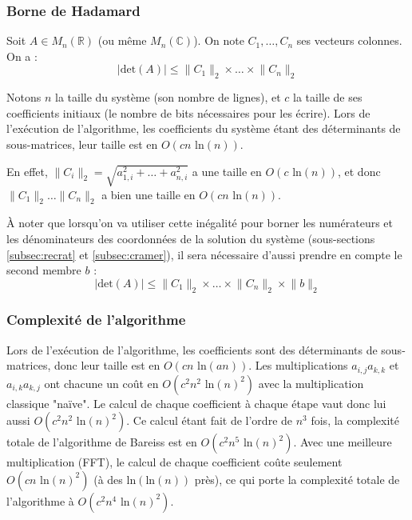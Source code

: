 \documentclass[french]{article}
\begin{document}
\subsubsection{Borne de Hadamard} \label{subsubsec:hada}
Soit $A \in M_n(\mathbb{R})$ (ou même $M_n(\mathbb{C})$). On note $C_1,\hdots,C_n$ ses vecteurs colonnes. On a :
$$ \lvert \mbox{det}(A) \rvert \le \lVert C_1 \rVert_2 \times \hdots \times \lVert C_n \rVert_2$$
\par
Notons $n$ la taille du système (son nombre de lignes), et $c$ la taille de ses coefficients initiaux (le nombre de bits nécessaires pour les écrire). Lors de l'exécution de l'algorithme, les coefficients du système étant des déterminants de sous-matrices, leur taille est en $O(cn \mbox{ ln}(n))$.
\par
En effet, $\lVert C_i \rVert_2 = \sqrt{a_{1,i}^2 + \hdots + a_{n,i}^2}$ a une taille en $O(c\mbox{ ln}(n))$, et donc $\lVert C_1 \rVert_2 \hdots \lVert C_n \rVert_2$ a bien une taille en $O(cn \mbox{ ln}(n))$.
\par
À noter que lorsqu'on va utiliser cette inégalité pour borner les numérateurs et les dénominateurs des coordonnées de la solution du système (sous-sections \ref{subsec:recrat} et \ref{subsec:cramer}), il sera nécessaire d'aussi prendre en compte le second membre $b$ :
$$ \lvert \mbox{det}(A) \rvert \le \lVert C_1 \rVert_2 \times \hdots \times \lVert C_n \rVert_2 \times \lVert b \rVert_2$$
\subsubsection{Complexité de l'algorithme}
 Lors de l'exécution de l'algorithme, les coefficients sont des déterminants de sous-matrices, donc leur taille est en $O(cn \mbox{ ln}(a n))$. Les multiplications $a_{i,j} a_{k,k}$ et $a_{i,k} a_{k,j}$ ont chacune un coût en $O(c^2 n^2 \mbox{ ln}(n)^2)$ avec la multiplication classique "naïve". Le calcul de chaque coefficient à chaque étape vaut donc lui aussi $O(c^2 n^2 \mbox{ ln}(n)^2)$. Ce calcul étant fait de l'ordre de $n^3$ fois, la complexité totale de l'algorithme de Bareiss est en $O(c^2 n^5 \mbox{ ln}(n)^2)$. Avec une meilleure multiplication (FFT), le calcul de chaque coefficient coûte seulement $O(cn \mbox{ ln}(n)^2)$ (à des $\mbox{ln}(\mbox{ln}(n))$ près), ce qui porte la complexité totale de l'algorithme à $O(c^2 n^4 \mbox{ ln}(n)^2)$.
 \vspace{1,5cm}
\end{document}
